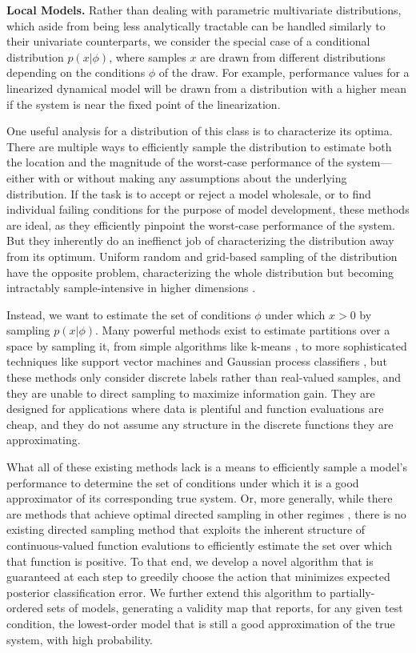 \documentclass[12pt, conference]{IEEEtran}
\begin{document}
\noindent\textbf{Local Models.} Rather than dealing with parametric multivariate distributions, which aside from being less analytically tractable can be handled similarly to their univariate counterparts, we consider the special case of a conditional distribution $p(x|\phi)$, where samples $x$ are drawn from different distributions depending on the conditions $\phi$ of the draw. For example, performance values for a linearized dynamical model will be drawn from a distribution with a higher mean if the system is near the fixed point of the linearization.

One useful analysis for a distribution of this class is to characterize its optima. There are multiple ways to efficiently sample the distribution to estimate both the location and the magnitude of the worst-case performance of the system---either with \cite{chowdhury17,srinivas09} or without \cite{bonyadi17,akella22} making any assumptions about the underlying distribution. If the task is to accept or reject a model wholesale, or to find individual failing conditions for the purpose of model development, these methods are ideal, as they efficiently pinpoint the worst-case performance of the system. But they inherently do an ineffienct job of characterizing the distribution away from its optimum. Uniform random and grid-based sampling of the distribution have the opposite problem, characterizing the whole distribution but becoming intractably sample-intensive in higher dimensions \cite{chen15,he20}.

Instead, we want to estimate the set of conditions $\phi$ under which $x>0$ by sampling $p(x|\phi)$. Many powerful methods exist to estimate partitions over a space by sampling it, from simple algorithms like k-means \cite{ahmed03}, to more sophisticated techniques like support vector machines and Gaussian process classifiers \cite{boser92,gibbs00}, but these methods only consider discrete labels rather than real-valued samples, and they are unable to direct sampling to maximize information gain. They are designed for applications where data is plentiful and function evaluations are cheap, and they do not assume any structure in the discrete functions they are approximating. 

What all of these existing methods lack is a means to efficiently sample a model's performance to determine the set of conditions under which it is a good approximator of its corresponding true system. Or, more generally, while there are methods that achieve optimal directed sampling in other regimes \cite{kirschner21}, there is no existing directed sampling method that exploits the inherent structure of continuous-valued function evalutions to efficiently estimate the set over which that function is positive. To that end, we develop a novel algorithm that is guaranteed at each step to greedily choose the action that minimizes expected posterior classification error. We further extend this algorithm to partially-ordered sets of models, generating a validity map that reports, for any given test condition, the lowest-order model that is still a good approximation of the true system, with high probability.
\end{document}
